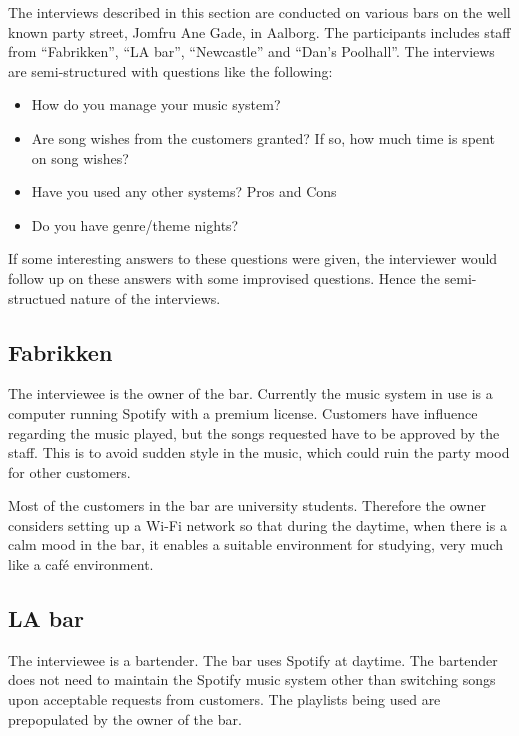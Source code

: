The interviews described in this section are conducted on various bars on the well known party street, Jomfru Ane Gade, in Aalborg. The participants includes staff from \enquote{Fabrikken}, \enquote{LA bar}, \enquote{Newcastle} and \enquote{Dan's Poolhall}. The interviews are semi-structured with questions like the following:

\begin{itemize}
  \item How do you manage your music system?
  \item Are song wishes from the customers granted? If so, how much time is spent on song wishes?
  \item Have you used any other systems? Pros and Cons
  \item Do you have genre/theme nights?
\end{itemize}

If some interesting answers to these questions were given, the interviewer would follow up on these answers with some improvised questions. Hence the semi-structued nature of the interviews.

\subsection{Fabrikken}
\label{sub:fabrikken}

The interviewee is the owner of the bar. Currently the music system in use is a computer running Spotify with a premium license. Customers have influence regarding the music played, but the songs requested have to be approved by the staff. This is to avoid sudden style in the music, which could ruin the party mood for other customers.

Most of the customers in the bar are university students. Therefore the owner considers setting up a Wi-Fi network so that during the daytime, when there is a calm mood in the bar, it enables a suitable environment for studying, very much like a café environment.

\subsection{LA bar}
\label{sub:la_bar}

The interviewee is a bartender. The bar uses Spotify at daytime. The bartender does not need to maintain the Spotify music system other than switching songs upon acceptable requests from customers. The playlists being used are prepopulated by the owner of the bar.

